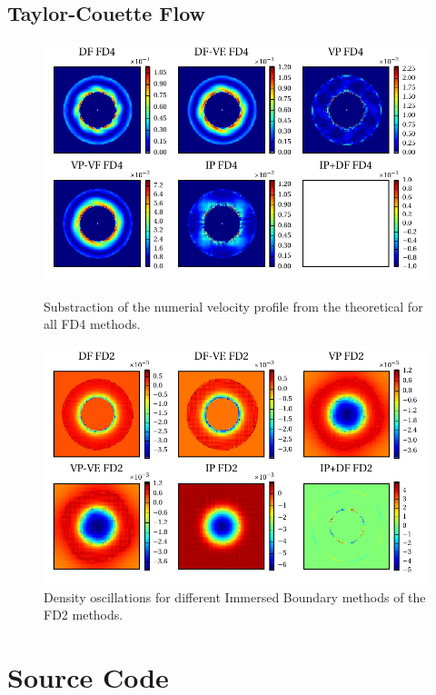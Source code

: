 \section{Taylor-Couette Flow}

\begin{figure}[!h]
  \includegraphics{gfx/immersed_boundary/tcflow/long/vz_profiles_o4.pdf}
  \caption{\label{tcflow:results_vprofiles_o4}
    Substraction of the numerial velocity profile from the theoretical
        for all FD4 methods.}
  \includegraphics{gfx/immersed_boundary/tcflow/long/rho_o2.pdf}
  \caption{Density oscillations for different Immersed Boundary methods of the FD2 methods.}
    \label{tcflow:results_rho_profiles_o2}
\end{figure}
\clearpage

\chapter{Source Code}

